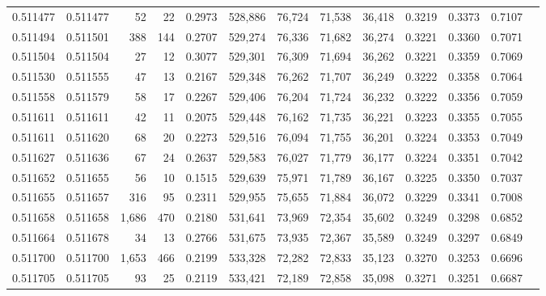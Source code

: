 \begin{tabular}{rrrrrrrrrrrrr}
0.511477 & 0.511477 &    52 &    22 &                                     0.2973 & 528,886 &  76,724 &  71,538 &  36,418 & 0.3219 & 0.3373 & 0.7107 \\
0.511494 & 0.511501 &   388 &   144 &                                     0.2707 & 529,274 &  76,336 &  71,682 &  36,274 & 0.3221 & 0.3360 & 0.7071 \\
0.511504 & 0.511504 &    27 &    12 &                                     0.3077 & 529,301 &  76,309 &  71,694 &  36,262 & 0.3221 & 0.3359 & 0.7069 \\
0.511530 & 0.511555 &    47 &    13 &                                     0.2167 & 529,348 &  76,262 &  71,707 &  36,249 & 0.3222 & 0.3358 & 0.7064 \\
0.511558 & 0.511579 &    58 &    17 &                                     0.2267 & 529,406 &  76,204 &  71,724 &  36,232 & 0.3222 & 0.3356 & 0.7059 \\
0.511611 & 0.511611 &    42 &    11 &                                     0.2075 & 529,448 &  76,162 &  71,735 &  36,221 & 0.3223 & 0.3355 & 0.7055 \\
0.511611 & 0.511620 &    68 &    20 &                                     0.2273 & 529,516 &  76,094 &  71,755 &  36,201 & 0.3224 & 0.3353 & 0.7049 \\
0.511627 & 0.511636 &    67 &    24 &                                     0.2637 & 529,583 &  76,027 &  71,779 &  36,177 & 0.3224 & 0.3351 & 0.7042 \\
0.511652 & 0.511655 &    56 &    10 &                                     0.1515 & 529,639 &  75,971 &  71,789 &  36,167 & 0.3225 & 0.3350 & 0.7037 \\
0.511655 & 0.511657 &   316 &    95 &                                     0.2311 & 529,955 &  75,655 &  71,884 &  36,072 & 0.3229 & 0.3341 & 0.7008 \\
0.511658 & 0.511658 & 1,686 &   470 &                                     0.2180 & 531,641 &  73,969 &  72,354 &  35,602 & 0.3249 & 0.3298 & 0.6852 \\
0.511664 & 0.511678 &    34 &    13 &                                     0.2766 & 531,675 &  73,935 &  72,367 &  35,589 & 0.3249 & 0.3297 & 0.6849 \\
0.511700 & 0.511700 & 1,653 &   466 &                                     0.2199 & 533,328 &  72,282 &  72,833 &  35,123 & 0.3270 & 0.3253 & 0.6696 \\
0.511705 & 0.511705 &    93 &    25 &                                     0.2119 & 533,421 &  72,189 &  72,858 &  35,098 & 0.3271 & 0.3251 & 0.6687 \\

\end{tabular}
